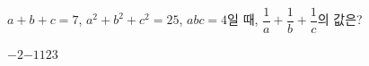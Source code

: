 $a+b+c=7$, $a^2+b^2+c^2=25$, $abc=4$일 때, $\dfrac{1}{a}+\dfrac{1}{b}+\dfrac{1}{c}$의 값은?
\begin{choices32}{$-2$}{$-1$}{$1$}{$2$}{$3$}\end{choices32}

